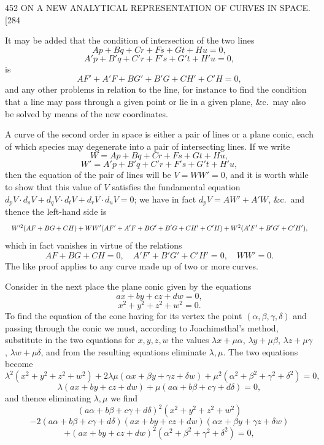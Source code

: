 \documentclass[11pt]{article}
\begin{document}
\begin{center}
452 \hfill ON A NEW ANALYTICAL REPRESENTATION OF CURVES IN SPACE. \hfill \textsc{[284}
\end{center}

It may be added that the condition of intersection of the two lines
\[ Ap+Bq+Cr+Fs+Gt+Hu=0, \]
\[ A'p+B'q+C'r+F's+G't+H'u=0, \]
is
\[ AF'+A'F+BG'+B'G+CH'+C'H=0, \]
and any other problems in relation to the line, for instance to find the condition
that a line may pass through a given point or lie in a given plane, \&c.\ may also be
solved by means of the new coordinates.

A curve of the second order in space is either a pair of lines or a plane conic,
each of which species may degenerate into a pair of intersecting lines. If we write
\[ W=Ap+Bq+Cr+Fs+Gt+Hu, \]
\[ W'=A'p+B'q+C'r+F's+G't+H'u, \]
then the equation of the pair of lines will be $V=WW'=0$, and it is worth while to
show that this value of $V$ satisfies the fundamental equation
$d_{p}V\cdot d_{s}V+d_{q}V\cdot d_{t}V+d_{r}V\cdot d_{u}V=0$; we have in fact
$d_{p}V=AW'+A'W$, \&c.\ and thence the left-hand side is
\[ \resizebox{\textwidth}{!}{$\displaystyle
W'^{2}(AF+BG+CH)+WW'(AF'+A'F+BG'+B'G+CH'+C'H)+W^{2}(A'F'+B'G'+C'H'),
$} \]
which in fact vanishes in virtue of the relations
\[ AF+BG+CH=0,\quad A'F'+B'G'+C'H'=0,\quad WW'=0. \]
The like proof applies to any curve made up of two or more curves.

Consider in the next place the plane conic given by the equations
\[ ax+by+cz+dw=0, \]
\[ x^{2}+y^{2}+z^{2}+w^{2}=0. \]
To find the equation of the cone having for its vertex the point $(\alpha,\beta,\gamma,\delta)$
and passing through the conic we must, according to Joachimsthal's method, substitute
in the two equations for $x,y,z,w$ the values $\lambda x+\mu\alpha$, $\lambda y+\mu\beta$,
$\lambda z+\mu\gamma$, $\lambda w+\mu\delta$, and from the resulting equations
eliminate $\lambda,\mu$. The two equations become
\[ \lambda^{2}(x^{2}+y^{2}+z^{2}+w^{2})+2\lambda\mu(\alpha x+\beta y+\gamma z+\delta w)+\mu^{2}(\alpha^{2}+\beta^{2}+\gamma^{2}+\delta^{2})=0, \]
\[ \lambda(ax+by+cz+dw)+\mu(a\alpha+b\beta+c\gamma+d\delta)=0, \]
and thence eliminating $\lambda,\mu$ we find
\[ (a\alpha+b\beta+c\gamma+d\delta)^{2}(x^{2}+y^{2}+z^{2}+w^{2}) \]
\[ -2(a\alpha+b\beta+c\gamma+d\delta)(ax+by+cz+dw)(\alpha x+\beta y+\gamma z+\delta w) \]
\[ +(ax+by+cz+dw)^{2}(\alpha^{2}+\beta^{2}+\gamma^{2}+\delta^{2})=0, \]
\end{document}
